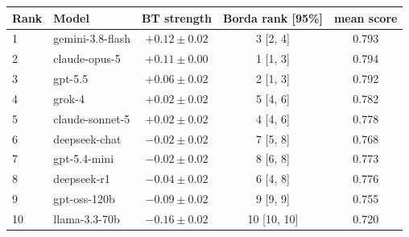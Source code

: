 \begin{tabular}{llccc}
\toprule
Rank & Model & BT strength & Borda rank [95\%] & mean score \\
\midrule
1 & gemini-3.8-flash & $+0.12 \pm 0.02$ & 3 [2, 4] & 0.793 \\
2 & claude-opus-5 & $+0.11 \pm 0.00$ & 1 [1, 3] & 0.794 \\
3 & gpt-5.5 & $+0.06 \pm 0.02$ & 2 [1, 3] & 0.792 \\
4 & grok-4 & $+0.02 \pm 0.02$ & 5 [4, 6] & 0.782 \\
5 & claude-sonnet-5 & $+0.02 \pm 0.02$ & 4 [4, 6] & 0.778 \\
6 & deepseek-chat & $-0.02 \pm 0.02$ & 7 [5, 8] & 0.768 \\
7 & gpt-5.4-mini & $-0.02 \pm 0.02$ & 8 [6, 8] & 0.773 \\
8 & deepseek-r1 & $-0.04 \pm 0.02$ & 6 [4, 8] & 0.776 \\
9 & gpt-oss-120b & $-0.09 \pm 0.02$ & 9 [9, 9] & 0.755 \\
10 & llama-3.3-70b & $-0.16 \pm 0.02$ & 10 [10, 10] & 0.720 \\
\bottomrule
\end{tabular}
